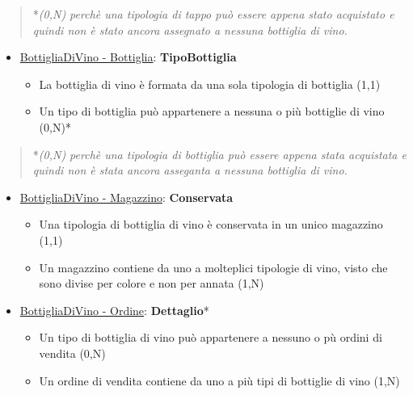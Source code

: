 \begin{verse}
	*\emph{(0,N) perchè una tipologia di tappo può essere appena stato acquistato e quindi non è stato ancora assegnato a nessuna bottiglia di vino.}
\end{verse}

\begin{itemize}
	\item \underline{BottigliaDiVino - Bottiglia}: \textbf{TipoBottiglia}
	
	\begin{itemize}
		\item La bottiglia di vino è formata da una sola tipologia di bottiglia (1,1)
		\item Un tipo di bottiglia può appartenere a nessuna o più bottiglie di vino (0,N)*
	\end{itemize}
	
\end{itemize}

\begin{verse}
	*\emph{(0,N) perchè una tipologia di bottiglia può essere appena stata acquistata e quindi non è stata ancora asseganta a nessuna bottiglia di vino.}
\end{verse}

\begin{itemize}
	\item \underline{BottigliaDiVino - Magazzino}: \textbf{Conservata}
	
	\begin{itemize}
		\item Una tipologia di bottiglia di vino è conservata in un unico magazzino (1,1)
		\item Un magazzino contiene da uno a molteplici tipologie di vino, visto che sono divise per colore e non per annata (1,N)
	\end{itemize}
	
\end{itemize}

\begin{itemize}
	\item \underline{BottigliaDiVino - Ordine}: \textbf{Dettaglio}*
	
	\begin{itemize}
		\item Un tipo di bottiglia di vino può appartenere a nessuno o pù ordini di vendita (0,N)
		\item Un ordine di vendita contiene da uno a più tipi di bottiglie di vino (1,N)
	\end{itemize}
	
\end{itemize}

